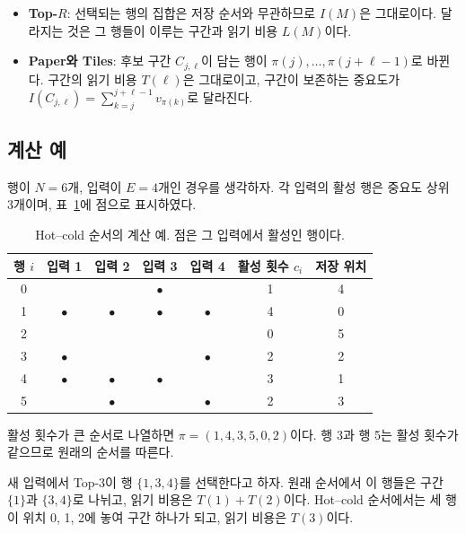 \begin{itemize}
\item \textbf{Top-$R$}: 선택되는 행의 집합은 저장 순서와 무관하므로 $I(M)$은 그대로이다. 달라지는 것은 그 행들이 이루는 구간과 읽기 비용 $L(M)$이다.
\item \textbf{Paper와 Tiles}: 후보 구간 $C_{j,\ell}$이 담는 행이 $\pi(j),\ldots,\pi(j+\ell-1)$로 바뀐다. 구간의 읽기 비용 $T(\ell)$은 그대로이고, 구간이 보존하는 중요도가 $I(C_{j,\ell})=\sum_{k=j}^{j+\ell-1}v_{\pi(k)}$로 달라진다.
\end{itemize}

\subsection{계산 예}\label{sec:hot-cold-example}

행이 $N=6$개, 입력이 $E=4$개인 경우를 생각하자. 각 입력의 활성 행은 중요도 상위 3개이며, 표~\ref{tab:hot-cold-example}에 점으로 표시하였다.

\begin{table}[htbp]
    \centering
    \caption{Hot--cold 순서의 계산 예. 점은 그 입력에서 활성인 행이다.}
    \label{tab:hot-cold-example}
    \begin{tabular}{ccccccc}
        \toprule
        행 $i$ & 입력 1 & 입력 2 & 입력 3 & 입력 4 & 활성 횟수 $c_i$ & 저장 위치 \\
        \midrule
        0 &           &           & $\bullet$ &           & 1 & 4 \\
        1 & $\bullet$ & $\bullet$ & $\bullet$ & $\bullet$ & 4 & 0 \\
        2 &           &           &           &           & 0 & 5 \\
        3 & $\bullet$ &           &           & $\bullet$ & 2 & 2 \\
        4 & $\bullet$ & $\bullet$ & $\bullet$ &           & 3 & 1 \\
        5 &           & $\bullet$ &           & $\bullet$ & 2 & 3 \\
        \bottomrule
    \end{tabular}
\end{table}

활성 횟수가 큰 순서로 나열하면 $\pi=(1,4,3,5,0,2)$이다. 행 3과 행 5는 활성 횟수가 같으므로 원래의 순서를 따른다.

새 입력에서 Top-3이 행 $\{1,3,4\}$를 선택한다고 하자. 원래 순서에서 이 행들은 구간 $\{1\}$과 $\{3,4\}$로 나뉘고, 읽기 비용은 $T(1)+T(2)$이다. Hot--cold 순서에서는 세 행이 위치 0, 1, 2에 놓여 구간 하나가 되고, 읽기 비용은 $T(3)$이다.

